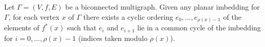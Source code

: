 Let $\Gamma = (V, f, E)$ be a biconnected multigraph. Given any planar imbedding for $\Gamma$, for each vertex $x$ of $\Gamma$ there exists a cyclic ordering $e_0, \ldots, e_{\rho(x)-1}$ of the elements of $f^*(x)$ such that $e_i$ and $e_{i+1}$ lie in a common cycle of the imbedding for $i = 0, \ldots, \rho(x) - 1$ (indices taken modulo $\rho(x)$).
